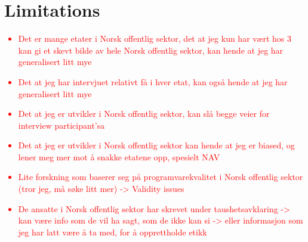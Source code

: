 \section{Limitations}
\textcolor{red}{\begin{itemize}
    \item Det er mange etater i Norsk offentlig sektor, det at jeg kun har vært hos 3 kan gi et skevt bilde av hele Norsk offentlig sektor, kan hende at jeg har generalisert litt mye
    \item Det at jeg har intervjuet relativt få i hver etat, kan også hende at jeg har generalisert litt mye
    \item Det at jeg er utvikler i Norsk offentlig sektor, kan slå begge veier for interview participant'sa
    \item Det at jeg er utvikler i Norsk offentlig sektor kan hende at jeg er biased, og lener meg mer mot å snakke etatene opp, spesielt NAV
    \item Lite forskning som baserer seg på programvarekvalitet i Norsk offentlig sektor (tror jeg, må søke litt mer) -> Validity issues
    \item De ansatte i Norsk offentlig sektor har skrevet under taushetsavklaring -> kan være info som de vil ha sagt, som de ikke kan si -> eller informasjon som jeg har latt være å ta med, for å opprettholde etikk
\end{itemize}}


